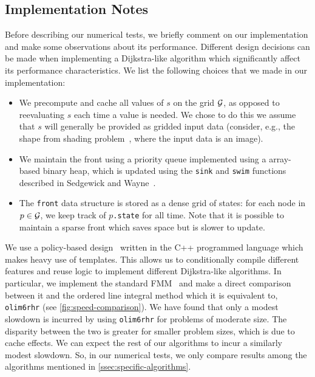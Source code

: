 \documentclass[sisc-eikonal.tex]{subfiles}
\begin{document}
\subsection{Implementation Notes}\label{ssec:impl-notes}

Before describing our numerical tests, we briefly comment on our
implementation and make some observations about its
performance. Different design decisions can be made when implementing
a Dijkstra-like algorithm which significantly affect its performance
characteristics. We list the following choices that we made in our
implementation:
\begin{itemize}
\item We precompute and cache all values of $s$ on the grid $\mathcal{G}$,
  as opposed to reevaluating $s$ each time a value is needed. We chose
  to do this we assume that $s$ will generally be provided as gridded
  input data (consider, e.g., the shape from shading
  problem~\cite{kimmel2001optimal}, where the input data is an image).
\item We maintain the front using a priority queue implemented using a
  array-based binary heap, which is updated using the \texttt{sink}
  and \texttt{swim} functions described in Sedgewick and
  Wayne~\cite{sedgewick2011algorithms}.
\item The \texttt{front} data structure is stored as a dense grid of
  states: for each node in $p \in \mathcal{G}$, we keep track of
  $p$\texttt{.state} for all time. Note that it is possible to
  maintain a sparse front which saves space but is slower to update.
\end{itemize}

We use a policy-based design~\cite{alexandrescu2001modern} written in
the C++ programmed language which makes heavy use of templates. This
allows us to conditionally compile different features and reuse logic
to implement different Dijkstra-like algorithms. In particular, we
implement the standard FMM~\cite{sethian1996fast} and make a direct
comparison between it and the ordered line integral method which it is
equivalent to, \texttt{olim6rhr} (see \cref{fig:speed-comparison}). We
have found that only a modest slowdown is incurred by using
\texttt{olim6rhr} for problems of moderate size. The disparity between
the two is greater for smaller problem sizes, which is due to cache
effects. We can expect the rest of our algorithms to incur a similarly
modest slowdown. So, in our numerical tests, we only compare results
among the algorithms mentioned in \cref{ssec:specific-algorithms}.
\end{document}
